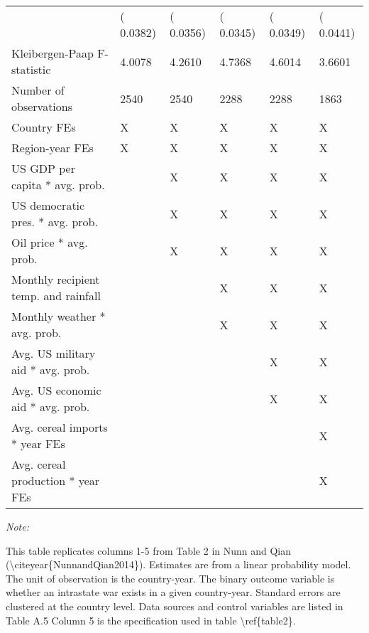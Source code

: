 \begin{table}
\begin{threeparttable}
\begin{tabular}[t]{llllll}
\hspace{1em} & (   0.0382) & (   0.0356) & (   0.0345) & (   0.0349) & (   0.0441)\\
\hspace{1em}Kleibergen-Paap F-statistic & 4.0078 & 4.2610 & 4.7368 & 4.6014 & 3.6601\\
\midrule
Number of observations & 2540 & 2540 & 2288 & 2288 & 1863\\
Country FEs & X & X & X & X & X\\
Region-year FEs & X & X & X & X & X\\
US GDP per capita * avg. prob. &  & X & X & X & X\\
US democratic pres. * avg. prob. &  & X & X & X & X\\
Oil price * avg. prob. &  & X & X & X & X\\
Monthly recipient temp. and rainfall &  &  & X & X & X\\
Monthly weather * avg. prob. &  &  & X & X & X\\
Avg. US military aid * avg. prob. &  &  &  & X & X\\
Avg. US economic aid * avg. prob. &  &  &  & X & X\\
Avg. cereal imports * year FEs &  &  &  &  & X\\
Avg. cereal production * year FEs &  &  &  &  & X\\
\bottomrule
\end{tabular}
\begin{tablenotes}[para]
\item \textit{Note: } 
\item This table replicates columns 1-5 from Table 2 in Nunn and Qian (\textbackslash{}citeyear\{NunnandQian2014\}). Estimates are from a linear probability model. The unit of observation is the country-year. The binary outcome variable is whether an intrastate war exists in a given country-year. Standard errors are clustered at the country level. Data sources and control variables are listed in Table A.5 Column 5 is the specification used in table \textbackslash{}ref\{table2\}.
\end{tablenotes}
\end{threeparttable}
\end{table}
